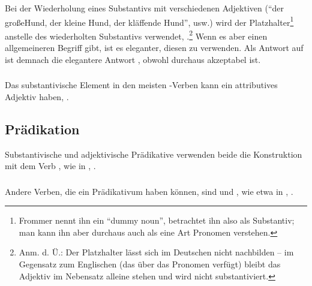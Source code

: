 \subsubsection{} Bei der Wiederholung eines Substantivs mit verschiedenen Adjektiven (``der große\linebreak Hund, der kleine Hund, der kläffende Hund'', usw.) wird der Platzhalter\footnote{Frommer nennt ihn ein ``dummy noun'', betrachtet ihn also als Substantiv; man kann ihn aber durchaus auch als eine Art Pronomen verstehen.}  anstelle des wiederholten Substantivs verwendet,  .\footnote{Anm. d. Ü.: Der Platzhalter lässt sich im Deutschen nicht nachbilden -- im Gegensatz zum Englischen (das über das Pronomen  verfügt) bleibt das Adjektiv im Nebensatz alleine stehen und wird nicht substantiviert.} Wenn es aber einen allgemeineren Begriff gibt, ist es eleganter, diesen zu verwenden. Als Antwort auf   ist demnach die elegantere Antwort  , obwohl  durchaus akzeptabel ist.\label{syn:pum:adj} 

\subsubsection{} Das substantivische Element in den meisten -Verben kann ein attributives Adjektiv haben,  .

\subsection{Prädikation} Substantivische und adjektivische Prädikative verwenden beide die Konstruktion mit dem Verb  , wie in  ,  .
\label{syn:predicates}

\subsubsection{} Andere Verben, die ein Prädikativum haben können, sind   und  , wie etwa in  ,  .

